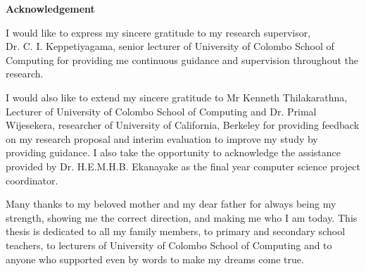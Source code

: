 \begin{center}
\textbf{\Large{Acknowledgement}}
\end{center}
\vspace{0.7cm}
\par
I would like to express my sincere gratitude to my research supervisor,\\
Dr. C. I. Keppetiyagama, senior lecturer of University of Colombo School of Computing for providing me continuous guidance and supervision throughout the research.

\vspace{12pt}


I would also like to extend my sincere gratitude to Mr Kenneth Thilakarathna, 
Lecturer of University of Colombo School of Computing and Dr. Primal Wijesekera, researcher of University of California, Berkeley for providing
feedback on my research proposal and interim evaluation to improve my study by providing guidance. I also take the opportunity to acknowledge
the assistance provided by Dr. H.E.M.H.B. Ekanayake as the final year computer
science project coordinator.


\vspace{12pt}


Many thanks to my beloved mother and my dear father for always being my
strength, showing me the correct direction, and making me who I am today. This
thesis is dedicated to all my family members, to primary and secondary school
teachers, to lecturers of University of Colombo School of Computing and to anyone
who supported even by words to make my dreams come true.

